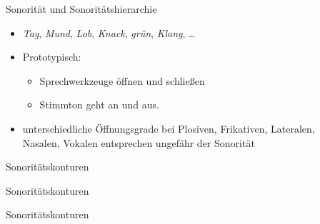 \begin{frame}[fragile]
  {Sonorität und Sonoritätshierarchie}
  \pause
  \begin{itemize}[<+->]
    \item \textit{Tag}, \textit{Mund}, \textit{Lob}, \textit{Knack}, \textit{grün}, \textit{Klang}, \dots
      \Zeile
    \item Prototypisch:
      \begin{itemize}[<+->]
        \item \alert{Sprechwerkzeuge öffnen und schließen}
        \item \alert{Stimmton geht an und aus.}
      \end{itemize}
      \Zeile
    \item unterschiedliche Öffnungsgrade bei Plosiven, Frikativen, Lateralen,\\
      Nasalen, Vokalen entsprechen ungefähr der \alert{Sonorität}
  \end{itemize}
  \pause
  \begin{center}
  \end{center}
\end{frame}


\begin{frame}[fragile]
  {Sonoritätskonturen}
  \pause
  \begin{center}
  \end{center}
\end{frame}

\begin{frame}[fragile]
  {Sonoritätskonturen}
  \begin{center}
  \end{center}
\end{frame}

\begin{frame}[fragile]
  {Sonoritätskonturen}
  \begin{center}
  \end{center}
\end{frame}

